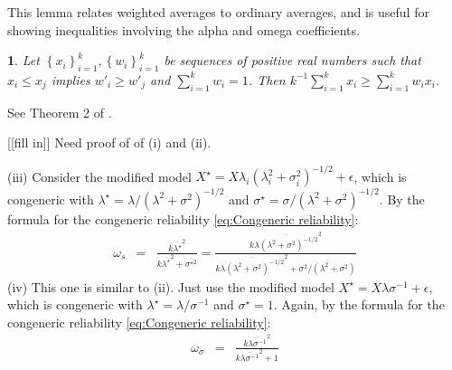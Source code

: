 \documentclass{article}
\makeatletter
\theoremstyle{plain}
\theoremstyle{plain}
\newtheorem{lemma}{\protect\lemmaname}
\theoremstyle{definition}
\theoremstyle{remark}
\theoremstyle{definition}
\theoremstyle{plain}
\theoremstyle{plain}
\theoremstyle{definition}
\newenvironment{proof}[1][\protect\proofname]{\par
	\normalfont\topsep6\p@\@plus6\p@\relax
	\trivlist
	\itemindent\parindent
	\item[\hskip\labelsep\scshape #1]\ignorespaces
}{%
	\endtrivlist\@endpefalse
}
\providecommand{\proofname}{Proof}
\providecommand{\lemmaname}{Lemma}
\makeatother
\begin{document}
This lemma relates weighted averages to ordinary averages, and is useful for showing inequalities involving the alpha and omega coefficients.

\begin{lemma}
\label{lemma:weighted averages}Let $\left\{ x_{i}\right\} _{i=1}^{k},\left\{ w_{i}\right\} _{i=1}^{k}$
be sequences of positive real numbers such that $x_{i}\leq x_{j}$ implies
$w'_{i}\geq w'_{j}$ and $\sum_{i=1}^{k}w_{i}=1$. Then $k^{-1}\sum_{i=1}^{k}x_{i}\geq\sum_{i=1}^{k}w_{i}x_{i}.$
\end{lemma}

\begin{proof}
See Theorem 2 of \citep{Sbert2016-al}.
\end{proof}

\begin{proof}[Proof of the claim $w_{0} = \overline{\lambda^{2}}/\left(k\overline{\lambda}^{2}+\overline{\sigma^{2}}\right)$ on page \pageref{eq:w0}]
\label{proof:w0}
\end{proof}

\begin{proof}[Proof of Proposition \ref{prop:Z-reliabiltiy}]\label{proof:Z-reliability}
[[fill in]] Need proof of of (i) and (ii).

(iii) Consider the modified
model $X^{\star}=X\lambda_{i}(\lambda_{i}^{2}+\sigma_{i}^{2})^{-1/2}+\epsilon$,
which is congeneric with $\lambda^{\star}=\lambda/(\lambda^{2}+\sigma^{2})^{-1/2}$
and $\sigma^{\star}=\sigma/(\lambda^{2}+\sigma^{2})^{-1/2}$. By the formula for the congeneric reliability \eqref{eq:Congeneric reliability}:
\begin{eqnarray*}
\omega_s & = & \frac{k\overline{\lambda^{\star}}^{2}}{k\overline{\lambda^{\star}}^{2}+\overline{\sigma^{\star2}}} = \frac{k\overline{\lambda(\lambda^{2}+\sigma^{2})^{-1/2}}^{2}}{k\overline{\lambda(\lambda^{2}+\sigma^{2})^{-1/2}}^{2}+\overline{\sigma^{2}/(\lambda^{2}+\sigma^{2})}}
\end{eqnarray*}
(iv) This one is similar to (ii). Just use the modified model $X^{\star}=X\lambda\sigma^{-1}+\epsilon$,
which is congeneric with $\lambda^{\star}=\lambda/\sigma^{-1}$ and
$\sigma^{\star}=1$. Again, by the formula for the congeneric reliability \eqref{eq:Congeneric reliability}:
\begin{eqnarray*}
\omega_\sigma & = & \frac{k\overline{\lambda\sigma^{-1}}^{2}}{k\overline{\lambda\sigma^{-1}}^{2}+1}
\end{eqnarray*}
\end{proof}
\end{document}
